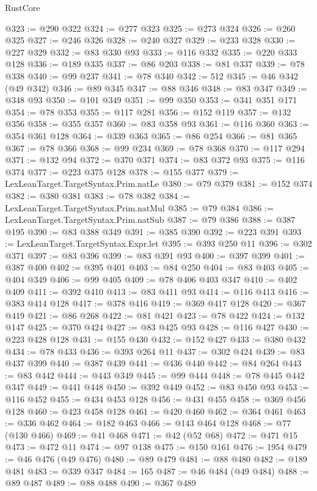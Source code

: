 \begin{lexlean}{RustCore}
\begin{coremodule}
@323 := @290 @322
@324 := @277 @323
@325 := @273 @324
@326 := @260 @325
@327 := @246 @326
@328 := @240 @327
@329 := @233 @328
@330 := @227 @329
@332 := @83 @330 @93
@333 := @116 @332
@335 := @220 @333 @128
@336 := @189 @335
@337 := @86 @203
@338 := @81 @337
@339 := @78 @338
@340 := @99 @237
@341 := @78 @340
@342 := 512
@345 := @46 @342 (@49 @342)
@346 := @89 @345
@347 := @88 @346
@348 := @83 @347
@349 := @348 @93
@350 := @101 @349
@351 := @99 @350
@353 := @341 @351 @171
@354 := @78 @353
@355 := @117 @281
@356 := @152 @119
@357 := @132 @356
@358 := @355 @357
@360 := @83 @358 @93
@361 := @116 @360
@363 := @354 @361 @128
@364 := @339 @363
@365 := @86 @254
@366 := @81 @365
@367 := @78 @366
@368 := @99 @234
@369 := @78 @368
@370 := @117 @294
@371 := @132 @94
@372 := @370 @371
@374 := @83 @372 @93
@375 := @116 @374
@377 := @223 @375 @128
@378 := @155 @377
@379 := LexLeanTarget.TargetSyntax.Prim.natLe
@380 := @79 @379
@381 := @152 @374
@382 := @380 @381
@383 := @78 @382
@384 := LexLeanTarget.TargetSyntax.Prim.natMul
@385 := @79 @384
@386 := LexLeanTarget.TargetSyntax.Prim.natSub
@387 := @79 @386
@388 := @387 @195
@390 := @83 @388 @349
@391 := @385 @390
@392 := @223 @391
@393 := LexLeanTarget.TargetSyntax.Expr.let
@395 := @393 @250 @11
@396 := @302 @371
@397 := @83 @396
@399 := @83 @391 @93
@400 := @397 @399
@401 := @387 @400
@402 := @395 @401
@403 := @84 @250
@404 := @83 @403
@405 := @404 @349
@406 := @99 @405
@409 := @78 @406 @403 @347
@410 := @402 @409
@411 := @392 @410
@413 := @83 @411 @93
@414 := @116 @413
@416 := @383 @414 @128
@417 := @378 @416
@419 := @369 @417 @128
@420 := @367 @419
@421 := @86 @268
@422 := @81 @421
@423 := @78 @422
@424 := @132 @147
@425 := @370 @424
@427 := @83 @425 @93
@428 := @116 @427
@430 := @223 @428 @128
@431 := @155 @430
@432 := @152 @427
@433 := @380 @432
@434 := @78 @433
@436 := @393 @264 @11
@437 := @302 @424
@439 := @83 @437 @399
@440 := @387 @439
@441 := @436 @440
@442 := @84 @264
@443 := @83 @442
@444 := @443 @349
@445 := @99 @444
@448 := @78 @445 @442 @347
@449 := @441 @448
@450 := @392 @449
@452 := @83 @450 @93
@453 := @116 @452
@455 := @434 @453 @128
@456 := @431 @455
@458 := @369 @456 @128
@460 := @423 @458 @128
@461 := @420 @460
@462 := @364 @461
@463 := @336 @462
@464 := @182 @463
@466 := @143 @464 @128
@468 := @77 (@130 @466)
@469 := @41 @468
@471 := @42 (@52 @68)
@472 := @471 @15
@473 := @472 @11
@474 := @97 @138
@475 := @150 @161
@476 := 1954
@479 := @46 @476 (@49 @476)
@480 := @89 @479
@481 := @88 @480
@482 := @189 @481
@483 := @339 @347
@484 := 165
@487 := @46 @484 (@49 @484)
@488 := @89 @487
@489 := @88 @488
@490 := @367 @489

\end{coremodule}
\end{lexlean}
